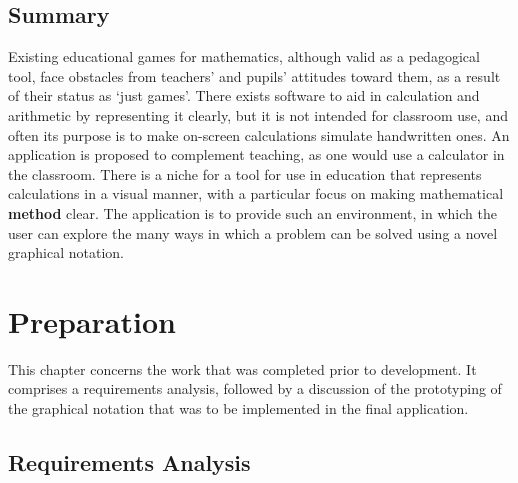 \documentclass[12pt,twoside,notitlepage,xetex]{report}
\begin{document}
\section{Summary}

Existing educational games for mathematics, although valid as a pedagogical tool, face obstacles from teachers' and pupils' attitudes toward them, as a result of their status as `just games'.  There exists software to aid in calculation and arithmetic by representing it clearly, but it is not intended for classroom use, and often its purpose is to make on-screen calculations simulate handwritten ones.  An application is proposed to complement teaching, as one would use a calculator in the classroom.  There is a niche for a tool for use in education that represents calculations in a visual manner, with a particular focus on making mathematical {\bf method} clear.  The application is to provide such an environment, in which the user can explore the many ways in which a problem can be solved using a novel graphical notation.%

\cleardoublepage



\chapter{Preparation}

This chapter concerns the work that was completed prior to development.  It comprises a requirements analysis, followed by a discussion of the prototyping of the graphical notation that was to be implemented in the final application.

\section{Requirements Analysis}
\end{document}
